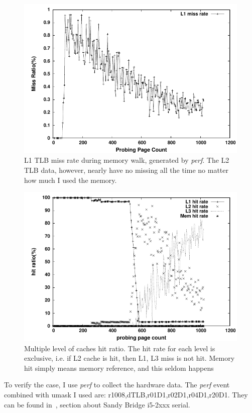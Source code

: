 \begin{figure}[hpb]
\centering
\includegraphics[width=0.9\linewidth]{../figures/tlb}
\caption{L1 TLB miss rate during memory walk, generated by \emph{perf}. The L2 TLB data, however, nearly have no missing all the time no matter how much I used the memory.
}
\label{fig:tlbsz-tlb}
\end{figure}

\begin{figure}[htp]
\centering
\includegraphics[width=0.9\linewidth]{../figures/cache}
\caption{Multiple level of caches hit ratio. The hit rate for each level is exclusive, i.e. if L2 cache is hit, then L1, L3 miss is not hit. Memory hit simply means memory reference, and this seldom happens}
\label{fig:tlbsz-cache}
\end{figure}

To verify the case, I use \emph{perf} to collect the hardware data. The \emph{perf}
event combined with umask I used are: r1008,dTLB,r01D1,r02D1,r04D1,r20D1. They can
 be found in~\cite{intel-dev3}, section about Sandy Bridge i5-2xxx serial.

